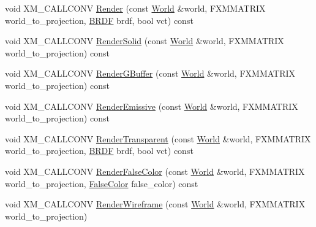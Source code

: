 \begin{DoxyCompactItemize}
void X\+M\+\_\+\+C\+A\+L\+L\+C\+O\+NV \mbox{\hyperlink{classmage_1_1rendering_1_1_forward_pass_ae8d819c35db0b35afe309c00448d1c83}{Render}} (const \mbox{\hyperlink{classmage_1_1rendering_1_1_world}{World}} \&world, F\+X\+M\+M\+A\+T\+R\+IX world\+\_\+to\+\_\+projection, \mbox{\hyperlink{namespacemage_1_1rendering_ab8fe8684ca4bd74ba3a394b00cf125b5}{B\+R\+DF}} brdf, bool vct) const
\item 
void X\+M\+\_\+\+C\+A\+L\+L\+C\+O\+NV \mbox{\hyperlink{classmage_1_1rendering_1_1_forward_pass_a7e473c7597d2b725cea68fa74fe20b56}{Render\+Solid}} (const \mbox{\hyperlink{classmage_1_1rendering_1_1_world}{World}} \&world, F\+X\+M\+M\+A\+T\+R\+IX world\+\_\+to\+\_\+projection) const
\item 
void X\+M\+\_\+\+C\+A\+L\+L\+C\+O\+NV \mbox{\hyperlink{classmage_1_1rendering_1_1_forward_pass_aaf7698f452eab9c6cb7cbc07b8991d5b}{Render\+G\+Buffer}} (const \mbox{\hyperlink{classmage_1_1rendering_1_1_world}{World}} \&world, F\+X\+M\+M\+A\+T\+R\+IX world\+\_\+to\+\_\+projection) const
\item 
void X\+M\+\_\+\+C\+A\+L\+L\+C\+O\+NV \mbox{\hyperlink{classmage_1_1rendering_1_1_forward_pass_ac272e648126ed4dc8386edddfc18cc76}{Render\+Emissive}} (const \mbox{\hyperlink{classmage_1_1rendering_1_1_world}{World}} \&world, F\+X\+M\+M\+A\+T\+R\+IX world\+\_\+to\+\_\+projection) const
\item 
void X\+M\+\_\+\+C\+A\+L\+L\+C\+O\+NV \mbox{\hyperlink{classmage_1_1rendering_1_1_forward_pass_a6fae34f08f23dc1a5d15921b239935fb}{Render\+Transparent}} (const \mbox{\hyperlink{classmage_1_1rendering_1_1_world}{World}} \&world, F\+X\+M\+M\+A\+T\+R\+IX world\+\_\+to\+\_\+projection, \mbox{\hyperlink{namespacemage_1_1rendering_ab8fe8684ca4bd74ba3a394b00cf125b5}{B\+R\+DF}} brdf, bool vct) const
\item 
void X\+M\+\_\+\+C\+A\+L\+L\+C\+O\+NV \mbox{\hyperlink{classmage_1_1rendering_1_1_forward_pass_ae18018111470a84e9313f11c72cc3326}{Render\+False\+Color}} (const \mbox{\hyperlink{classmage_1_1rendering_1_1_world}{World}} \&world, F\+X\+M\+M\+A\+T\+R\+IX world\+\_\+to\+\_\+projection, \mbox{\hyperlink{namespacemage_1_1rendering_a6c3d1f4e7a5ae72dc07226e971205534}{False\+Color}} false\+\_\+color) const
\item 
void X\+M\+\_\+\+C\+A\+L\+L\+C\+O\+NV \mbox{\hyperlink{classmage_1_1rendering_1_1_forward_pass_a1d6bbef579e996ffc34d25b29dd3ffef}{Render\+Wireframe}} (const \mbox{\hyperlink{classmage_1_1rendering_1_1_world}{World}} \&world, F\+X\+M\+M\+A\+T\+R\+IX world\+\_\+to\+\_\+projection)
\end{DoxyCompactItemize}
